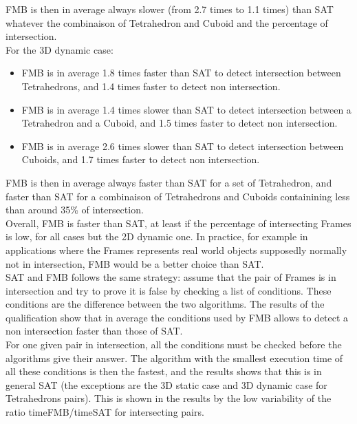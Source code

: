 \documentclass[12pt, a4paper]{article}
\begin{document}
FMB is then in average always slower (from 2.7 times to 1.1 times) than SAT whatever the combinaison of Tetrahedron and Cuboid and the percentage of intersection.\\ 

For the 3D dynamic case:\\

\begin{itemize}
\item FMB is in average 1.8 times faster than SAT to detect intersection between Tetrahedrons, and 1.4 times faster to detect non intersection.\\
\item FMB is in average 1.4 times slower than SAT to detect intersection between a Tetrahedron and a Cuboid, and 1.5 times faster to detect non intersection.\\
\item FMB is in average 2.6 times slower than SAT to detect intersection between Cuboids, and 1.7 times faster to detect non intersection.\\
\end{itemize}

FMB is then in average always faster than SAT for a set of Tetrahedron, and faster than SAT for a combinaison of Tetrahedrons and Cuboids containining less than around 35\% of intersection.\\ 

Overall, FMB is faster than SAT, at least if the percentage of intersecting Frames is low, for all cases but the 2D dynamic one. In practice, for example in applications where the Frames represents real world objects supposedly normally not in intersection, FMB would be a better choice than SAT.\\

SAT and FMB follows the same strategy: assume that the pair of Frames is in intersection and try to prove it is false by checking a list of conditions. These conditions are the difference between the two algorithms. The results of the qualification show that in average the conditions used by FMB allows to detect a non intersection faster than those of SAT.\\

For one given pair in intersection, all the conditions must be checked before the algorithms give their answer. The algorithm with the smallest execution time of all these conditions is then the fastest, and the results shows that this is in general SAT (the exceptions are the 3D static case and 3D dynamic case for Tetrahedrons pairs). This is shown in the results by the low variability of the ratio timeFMB/timeSAT for intersecting pairs.\\
\end{document}
